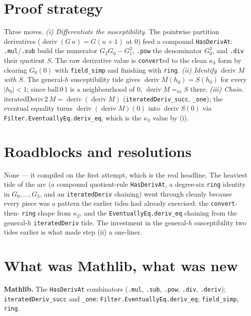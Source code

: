 \documentclass[11pt]{article}
\newcommand{\deriv}{\operatorname{deriv}}
\begin{document}
\section{Proof strategy}

Three moves. \emph{(i) Differentiate the susceptibility.} The pointwise
partition derivatives ($\deriv(G\,n)=G(n{+}1)$ at $0$) feed a compound
\texttt{HasDerivAt}: \texttt{.mul}/\texttt{.sub} build the numerator
$G_2 G_0 - G_1^2$, \texttt{.pow} the denominator $G_0^2$, and \texttt{.div}
their quotient $S$. The raw derivative value is \texttt{convert}ed to the clean
$\kappa_3$ form by clearing $G_0(0)$ with \texttt{field\_simp} and finishing
with \texttt{ring}. \emph{(ii) Identify $\deriv M$ with $S$.} The general-$h$
susceptibility tide gives $\deriv M(h_0)=S(h_0)$ for every $|h_0|<1$; since
$\mathrm{ball}\,0\,1$ is a neighbourhood of $0$, $\deriv M =_{\text{ev}} S$
there. \emph{(iii) Chain.} $\mathrm{iteratedDeriv}\,2\,M = \deriv(\deriv M)$
(\texttt{iteratedDeriv\_succ}, \texttt{\_one}); the eventual equality turns
$\deriv(\deriv M)(0)$ into $\deriv S(0)$ via
\texttt{Filter.EventuallyEq.deriv\_eq}, which is the $\kappa_3$ value by (i).

\section{Roadblocks and resolutions}

None --- it compiled on the first attempt, which is the real headline. The
heaviest tide of the arc (a compound quotient-rule \texttt{HasDerivAt}, a
degree-six \texttt{ring} identity in $G_0,\dots,G_3$, and an
\texttt{iteratedDeriv} chaining) went through cleanly because every piece was a
pattern the earlier tides had already exercised: the \texttt{convert}-then-%
\texttt{ring} shape from $\kappa_2$, and the \texttt{EventuallyEq.deriv\_eq}
chaining from the general-$h$ \texttt{iteratedDeriv} tide. The investment in the
general-$h$ susceptibility two tides earlier is what made step (ii) a one-liner.

\section{What was Mathlib, what was new}

\textbf{Mathlib.} The \texttt{HasDerivAt} combinators
(\texttt{.mul}, \texttt{.sub}, \texttt{.pow}, \texttt{.div}, \texttt{.deriv});
\texttt{iteratedDeriv\_succ} and \texttt{\_one};
\texttt{Filter.EventuallyEq.deriv\_eq}; \texttt{field\_simp}, \texttt{ring}.
\end{document}
